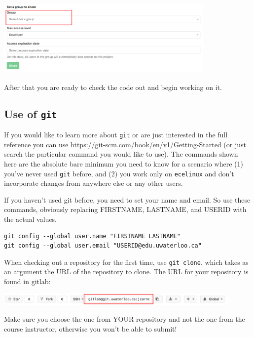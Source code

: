 \begin{center}
	\includegraphics[width=0.8\textwidth]{images/gitlab-group-add.png}
\end{center}

After that you are ready to check the code out and begin working on it.


\subsection*{Use of \texttt{git}}
If you would like to learn more about \texttt{git} or are just interested in the full reference you can use \url{https://git-scm.com/book/en/v1/Getting-Started} (or just search the particular command you would like to use). The commands shown here are the absolute bare minimum you need to know for a scenario where (1) you've never used \texttt{git} before, and (2) you work only on \texttt{ecelinux} and don't incorporate changes from anywhere else or any other users.

If you haven't used git before, you need to set your name and email. So use these commands, obviously replacing FIRSTNAME, LASTNAME, and USERID with the actual values. 
\begin{lstlisting}
git config --global user.name "FIRSTNAME LASTNAME"
git config --global user.email "USERID@edu.uwaterloo.ca"
\end{lstlisting}

When checking out a repository for the first time, use \texttt{git clone}, which takes as an argument the URL of the repository to clone. The URL for your repository is found in gitlab:

\begin{center}
	\includegraphics[width=0.9\textwidth]{images/gitlab-clone.png}
\end{center}

Make sure you choose the one from YOUR repository and not the one from the course instructor, otherwise you won't be able to submit! 

